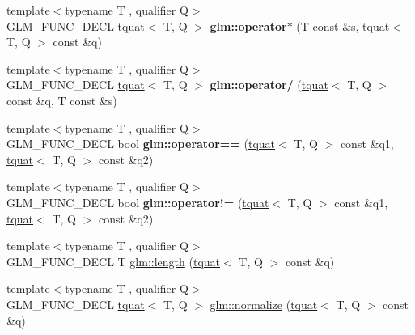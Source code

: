 \begin{DoxyCompactItemize}
\item 
\mbox{\label{group__gtc__quaternion_ga4203f1da1798e6f6dd2549c6daec4e5a}} 
{\footnotesize template$<$typename T , qualifier Q$>$ }\\G\+L\+M\+\_\+\+F\+U\+N\+C\+\_\+\+D\+E\+CL \hyperlink{structglm_1_1tquat}{tquat}$<$ T, Q $>$ {\bfseries glm\+::operator$\ast$} (T const \&s, \hyperlink{structglm_1_1tquat}{tquat}$<$ T, Q $>$ const \&q)
\item 
\mbox{\label{group__gtc__quaternion_ga077354a34d5111b6c904db7bf331a31f}} 
{\footnotesize template$<$typename T , qualifier Q$>$ }\\G\+L\+M\+\_\+\+F\+U\+N\+C\+\_\+\+D\+E\+CL \hyperlink{structglm_1_1tquat}{tquat}$<$ T, Q $>$ {\bfseries glm\+::operator/} (\hyperlink{structglm_1_1tquat}{tquat}$<$ T, Q $>$ const \&q, T const \&s)
\item 
\mbox{\label{group__gtc__quaternion_ga5892999628e2bcd46279c8df9be904b7}} 
{\footnotesize template$<$typename T , qualifier Q$>$ }\\G\+L\+M\+\_\+\+F\+U\+N\+C\+\_\+\+D\+E\+CL bool {\bfseries glm\+::operator==} (\hyperlink{structglm_1_1tquat}{tquat}$<$ T, Q $>$ const \&q1, \hyperlink{structglm_1_1tquat}{tquat}$<$ T, Q $>$ const \&q2)
\item 
\mbox{\label{group__gtc__quaternion_ga82de7204717a61a57d1bd321902bb9c6}} 
{\footnotesize template$<$typename T , qualifier Q$>$ }\\G\+L\+M\+\_\+\+F\+U\+N\+C\+\_\+\+D\+E\+CL bool {\bfseries glm\+::operator!=} (\hyperlink{structglm_1_1tquat}{tquat}$<$ T, Q $>$ const \&q1, \hyperlink{structglm_1_1tquat}{tquat}$<$ T, Q $>$ const \&q2)
\item 
{\footnotesize template$<$typename T , qualifier Q$>$ }\\G\+L\+M\+\_\+\+F\+U\+N\+C\+\_\+\+D\+E\+CL T \hyperlink{group__gtc__quaternion_gab33f82f8d1c9223d335aab752a126855}{glm\+::length} (\hyperlink{structglm_1_1tquat}{tquat}$<$ T, Q $>$ const \&q)
\item 
{\footnotesize template$<$typename T , qualifier Q$>$ }\\G\+L\+M\+\_\+\+F\+U\+N\+C\+\_\+\+D\+E\+CL \hyperlink{structglm_1_1tquat}{tquat}$<$ T, Q $>$ \hyperlink{group__gtc__quaternion_gad4f3769e33c18d1897d1857c1f8da864}{glm\+::normalize} (\hyperlink{structglm_1_1tquat}{tquat}$<$ T, Q $>$ const \&q)

\end{DoxyCompactItemize}
